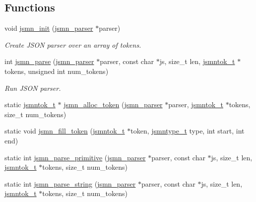 \subsection*{Functions}
\begin{DoxyCompactItemize}
\item 
void \hyperlink{namespace_json_parser_generator_r_k_adb1f5ae92d1df7b0b95f5caefbe0d55b}{jsmn\+\_\+init} (\hyperlink{struct_json_parser_generator_r_k_1_1jsmn__parser}{jsmn\+\_\+parser} $\ast$parser)
\begin{DoxyCompactList}\small\item\em Create J\+S\+ON parser over an array of tokens. \end{DoxyCompactList}\item 
int \hyperlink{namespace_json_parser_generator_r_k_acb71a39877526380a034824e99e59b75}{jsmn\+\_\+parse} (\hyperlink{struct_json_parser_generator_r_k_1_1jsmn__parser}{jsmn\+\_\+parser} $\ast$parser, const char $\ast$js, size\+\_\+t len, \hyperlink{struct_json_parser_generator_r_k_1_1jsmntok__t}{jsmntok\+\_\+t} $\ast$tokens, unsigned int num\+\_\+tokens)
\begin{DoxyCompactList}\small\item\em Run J\+S\+ON parser. \end{DoxyCompactList}\item 
static \hyperlink{struct_json_parser_generator_r_k_1_1jsmntok__t}{jsmntok\+\_\+t} $\ast$ \hyperlink{namespace_json_parser_generator_r_k_a5b9c58cf485e408ef0b95c201674a1bc}{jsmn\+\_\+alloc\+\_\+token} (\hyperlink{struct_json_parser_generator_r_k_1_1jsmn__parser}{jsmn\+\_\+parser} $\ast$parser, \hyperlink{struct_json_parser_generator_r_k_1_1jsmntok__t}{jsmntok\+\_\+t} $\ast$tokens, size\+\_\+t num\+\_\+tokens)
\item 
static void \hyperlink{namespace_json_parser_generator_r_k_a2b59144adb776aecb8bf1ad705aad7f5}{jsmn\+\_\+fill\+\_\+token} (\hyperlink{struct_json_parser_generator_r_k_1_1jsmntok__t}{jsmntok\+\_\+t} $\ast$token, \hyperlink{namespace_json_parser_generator_r_k_a45d8af9d310679633d258ed9b2caeeb3}{jsmntype\+\_\+t} type, int start, int end)
\item 
static int \hyperlink{namespace_json_parser_generator_r_k_aee5a37badfbb7bed92ca662a733fde8f}{jsmn\+\_\+parse\+\_\+primitive} (\hyperlink{struct_json_parser_generator_r_k_1_1jsmn__parser}{jsmn\+\_\+parser} $\ast$parser, const char $\ast$js, size\+\_\+t len, \hyperlink{struct_json_parser_generator_r_k_1_1jsmntok__t}{jsmntok\+\_\+t} $\ast$tokens, size\+\_\+t num\+\_\+tokens)
\item 
static int \hyperlink{namespace_json_parser_generator_r_k_a474570d80c95ff3722ae1e8e989c5999}{jsmn\+\_\+parse\+\_\+string} (\hyperlink{struct_json_parser_generator_r_k_1_1jsmn__parser}{jsmn\+\_\+parser} $\ast$parser, const char $\ast$js, size\+\_\+t len, \hyperlink{struct_json_parser_generator_r_k_1_1jsmntok__t}{jsmntok\+\_\+t} $\ast$tokens, size\+\_\+t num\+\_\+tokens)
\end{DoxyCompactItemize}


